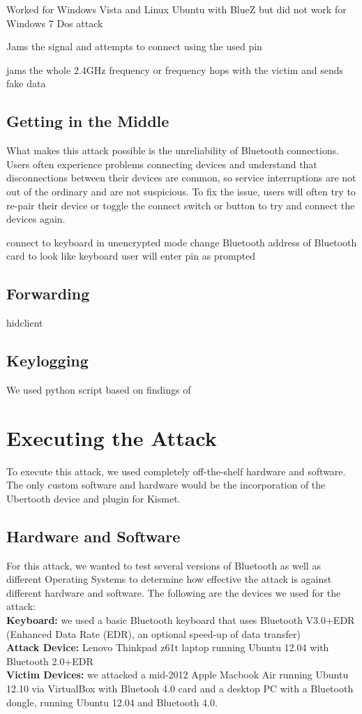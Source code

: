 \documentclass{acm_proc_article-sp}
\begin{document}
Worked for Windows Vista and Linux Ubuntu with BlueZ but did not work for Windows 7 \cite{cuthbertbluetooth}
Dos attack\cite{bandyopadhyay2010information}

Jams the signal and attempts to connect using the used pin\cite{barnickel2012implementing}


jams the whole 2.4GHz frequency or frequency hops with the victim and sends fake data \cite{4401672}

\subsection{Getting in the Middle}
What makes this attack possible is the unreliability of Bluetooth connections. Users often experience problems connecting devices and understand that disconnections between their devices are common, so service interruptions are not out of the ordinary and are not suspicious. To fix the issue, users will often try to re-pair their device or toggle the connect switch or button to try and connect the devices again. 

connect to keyboard in unencrypted mode
change Bluetooth address of Bluetooth card to look like keyboard 
user will enter pin as prompted

\subsection{Forwarding}
hidclient \cite{hidclient}
\subsection{Keylogging}
We used python script based on findings of \cite{chopper}


\section{Executing the Attack}
To execute this attack, we used completely off-the-shelf hardware and software. The only custom software and hardware would be the incorporation of the Ubertooth device and plugin for Kismet. 


\subsection{Hardware and Software}
For this attack, we wanted to test several versions of Bluetooth as well as different Operating Systems to determine how effective the attack is against different hardware and software. The following are the devices we used for the attack:\\
\textbf{Keyboard:} we used a basic Bluetooth keyboard that uses Bluetooth V3.0+EDR (Enhanced Data Rate (EDR), an optional speed-up of data transfer)\\
\textbf{Attack Device:} Lenovo Thinkpad z61t laptop running Ubuntu 12.04 with Bluetooth 2.0+EDR\\
\textbf{Victim Devices:} we attacked a mid-2012 Apple Macbook Air running Ubuntu 12.10 via VirtualBox with
Bluetooh 4.0 card and a desktop PC with a Bluetooth dongle, running Ubuntu 12.04 and Bluetooth 4.0.
\end{document}
